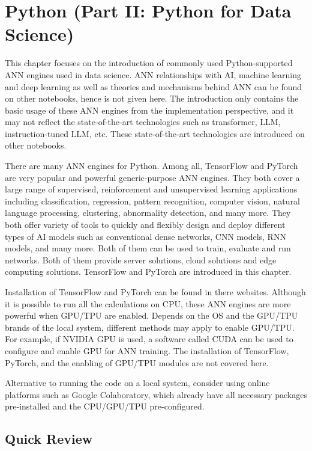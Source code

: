 \chapter{Python (Part II: Python for Data Science)} \label{ch:tftorch}

This chapter focuses on the introduction of commonly used Python-supported ANN engines used in data science. ANN relationships with AI, machine learning and deep learning as well as theories and mechanisms behind ANN can be found on other notebooks, hence is not given here. The introduction only contains the basic usage of these ANN engines from the implementation perspective, and it may not reflect the state-of-the-art technologies such as transformer, LLM, instruction-tuned LLM, etc. These state-of-the-art technologies are introduced on other notebooks.

There are many ANN engines for Python. Among all, TensorFlow and PyTorch are very popular and powerful generic-purpose ANN engines. They both cover a large range of supervised, reinforcement and unsupervised learning applications including classification, regression, pattern recognition, computer vision, natural language processing, clustering, abnormality detection, and many more. They both offer variety of tools to quickly and flexibly design and deploy different types of AI models such as conventional dense networks, CNN models, RNN models, and many more. Both of them can be used to train, evaluate and run networks. Both of them provide server solutions, cloud solutions and edge computing solutions.  TensorFlow and PyTorch are introduced in this chapter.

Installation of TensorFlow and PyTorch can be found in there websites. Although it is possible to run all the calculations on CPU, these ANN engines are more powerful when GPU/TPU are enabled. Depends on the OS and the GPU/TPU brands of the local system, different methods may apply to enable GPU/TPU. For example, if NVIDIA GPU is used, a software called CUDA can be used to configure and enable GPU for ANN training. The installation of TensorFlow, PyTorch, and the enabling of GPU/TPU modules are not covered here.

Alternative to running the code on a local system, consider using online platforms such as Google Colaboratory, which already have all necessary packages pre-installed and the CPU/GPU/TPU pre-configured.

\section{Quick Review}

